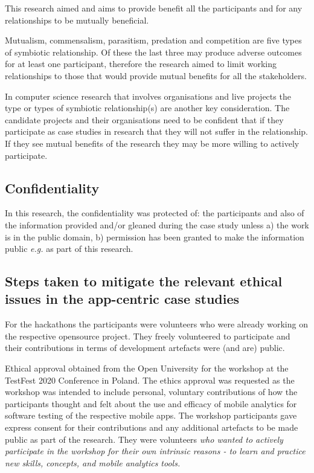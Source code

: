 
This research aimed and aims to provide benefit all the participants and for any relationships to be mutually beneficial.

Mutualism, commensalism, parasitism, predation and competition are five types of symbiotic relationship. %
Of these the last three may produce adverse outcomes for at least one participant, therefore the research aimed to limit working relationships to those that would provide mutual benefits for all the stakeholders.

In computer science research that involves organisations and live projects the type or types of symbiotic relationship(s) are another key consideration. The candidate projects and their organisations need to be confident that if they participate as case studies in research that they will not suffer in the relationship. If they see mutual benefits of the research they may be more willing to actively participate. 


\subsection{Confidentiality}
In this research, the confidentiality was protected of: the participants and also of the information provided and/or gleaned during the case study unless a) the work is in the public domain, b) permission has been granted to make the information public \textit{e.g.} as part of this research.

\subsection{Steps taken to mitigate the relevant ethical issues in the app-centric case studies}
For the hackathons the participants were volunteers who were already working on the respective opensource project. They freely volunteered to participate and their contributions in terms of development artefacts were (and are) public. 

Ethical approval obtained from the Open University for the workshop at the TestFest 2020 Conference in Poland. The ethics approval was requested as the workshop was intended to include personal, voluntary contributions of how the participants thought and felt about the use and efficacy of mobile analytics for software testing of the respective mobile apps. The workshop participants gave express consent for their contributions and any additional artefacts to be made public as part of the research. They were volunteers \textit{who wanted to actively participate in the workshop for their own intrinsic reasons - to learn and practice new skills, concepts, and mobile analytics tools.}

